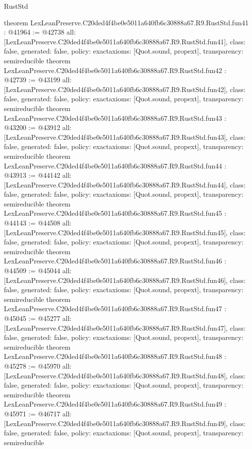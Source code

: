 \begin{lexlean}{RustStd}
\begin{coremodule}
{}
theorem LexLeanPreserve.C20ded4f4be0e5011a640fb6c30888a67.R9.RustStd.fun41 : @41964 := @42738 {
  all: [LexLeanPreserve.C20ded4f4be0e5011a640fb6c30888a67.R9.RustStd.fun41],
  class: false,
  generated: false,
  policy: exact{axioms: [Quot.sound, propext]},
  transparency: semireducible
}
theorem LexLeanPreserve.C20ded4f4be0e5011a640fb6c30888a67.R9.RustStd.fun42 : @42739 := @43199 {
  all: [LexLeanPreserve.C20ded4f4be0e5011a640fb6c30888a67.R9.RustStd.fun42],
  class: false,
  generated: false,
  policy: exact{axioms: [Quot.sound, propext]},
  transparency: semireducible
}
theorem LexLeanPreserve.C20ded4f4be0e5011a640fb6c30888a67.R9.RustStd.fun43 : @43200 := @43912 {
  all: [LexLeanPreserve.C20ded4f4be0e5011a640fb6c30888a67.R9.RustStd.fun43],
  class: false,
  generated: false,
  policy: exact{axioms: [Quot.sound, propext]},
  transparency: semireducible
}
theorem LexLeanPreserve.C20ded4f4be0e5011a640fb6c30888a67.R9.RustStd.fun44 : @43913 := @44142 {
  all: [LexLeanPreserve.C20ded4f4be0e5011a640fb6c30888a67.R9.RustStd.fun44],
  class: false,
  generated: false,
  policy: exact{axioms: [Quot.sound, propext]},
  transparency: semireducible
}
theorem LexLeanPreserve.C20ded4f4be0e5011a640fb6c30888a67.R9.RustStd.fun45 : @44143 := @44508 {
  all: [LexLeanPreserve.C20ded4f4be0e5011a640fb6c30888a67.R9.RustStd.fun45],
  class: false,
  generated: false,
  policy: exact{axioms: [Quot.sound, propext]},
  transparency: semireducible
}
theorem LexLeanPreserve.C20ded4f4be0e5011a640fb6c30888a67.R9.RustStd.fun46 : @44509 := @45044 {
  all: [LexLeanPreserve.C20ded4f4be0e5011a640fb6c30888a67.R9.RustStd.fun46],
  class: false,
  generated: false,
  policy: exact{axioms: [Quot.sound, propext]},
  transparency: semireducible
}
theorem LexLeanPreserve.C20ded4f4be0e5011a640fb6c30888a67.R9.RustStd.fun47 : @45045 := @45277 {
  all: [LexLeanPreserve.C20ded4f4be0e5011a640fb6c30888a67.R9.RustStd.fun47],
  class: false,
  generated: false,
  policy: exact{axioms: [Quot.sound, propext]},
  transparency: semireducible
}
theorem LexLeanPreserve.C20ded4f4be0e5011a640fb6c30888a67.R9.RustStd.fun48 : @45278 := @45970 {
  all: [LexLeanPreserve.C20ded4f4be0e5011a640fb6c30888a67.R9.RustStd.fun48],
  class: false,
  generated: false,
  policy: exact{axioms: [Quot.sound, propext]},
  transparency: semireducible
}
theorem LexLeanPreserve.C20ded4f4be0e5011a640fb6c30888a67.R9.RustStd.fun49 : @45971 := @46717 {
  all: [LexLeanPreserve.C20ded4f4be0e5011a640fb6c30888a67.R9.RustStd.fun49],
  class: false,
  generated: false,
  policy: exact{axioms: [Quot.sound, propext]},
  transparency: semireducible
}
\end{coremodule}
\end{lexlean}
